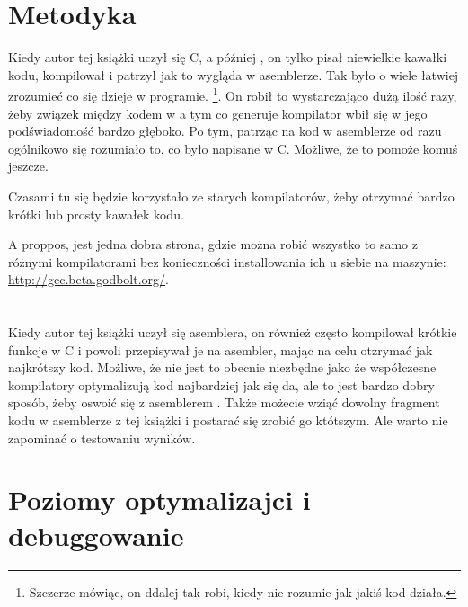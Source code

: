 \section{Metodyka}

Kiedy autor tej książki uczył się C, a później \Cpp, on tylko pisał niewielkie kawałki kodu, kompilował i patrzył jak to wygląda w asemblerze. Tak było o wiele łatwiej zrozumieć co się dzieje w programie.%
\footnote{Szczerze mówiąc, on ddalej tak robi, kiedy nie rozumie jak jakiś kod działa.}.
On robił to wystarczająco dużą ilość razy, żeby związek między kodem w \CCpp a tym co generuje kompilator wbił się w jego podświadomość bardzo głęboko. Po tym, patrząc na kod w asemblerze od razu ogólnikowo się rozumiało to, co było napisane w C. Możliwe, że to pomoże komuś jeszcze.


Czasami tu się będzie korzystało ze starych kompilatorów, żeby otrzymać bardzo krótki lub prosty kawałek kodu.

A proppos, jest jedna dobra strona, gdzie można robić wszystko to samo z różnymi kompilatorami bez konieczności installowania ich u siebie na maszynie: \url{http://gcc.beta.godbolt.org/}.

\section*{\Exercises}

Kiedy autor tej książki uczył się asemblera, on również często kompilował krótkie funkcje w C i powoli przepisywał je na asembler, mając na celu otzrymać jak najkrótszy kod. Możliwe, że nie jest to obecnie niezbędne jako że współczesne kompilatory optymalizują kod najbardziej jak się da, ale to jest bardzo dobry sposób, żeby oswoić się z asemblerem . Także możecie wziąć dowolny fragment kodu w asemblerze z tej książki i postarać się zrobić go któtszym. Ale warto nie zapominać o testowaniu wyników.

\section*{Poziomy optymalizajci i debuggowanie}

